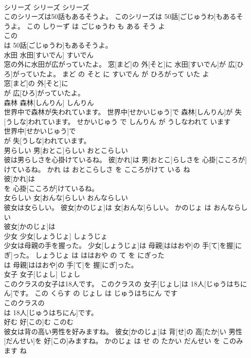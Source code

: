 \documentclass[8pt]{extreport}
\begin{document}
\begin{CJK}{UTF8}{min}
\\	シリーズ	シリーズ	シリーズ	
\\	このシリーズは50話もあるそうよ。	このシリーズは 50話[ごじゅうわ]もあるそうよ。	この しりーず は ごじゅうわ も ある そう よ	
\\	この
\\	は 50話[ごじゅうわ]もあるそうよ。			
\\	水田	水田[すいでん]	すいでん	
\\	窓の外に水田が広がっていたよ。	窓[まど]の 外[そと]に 水田[すいでん]が 広[ひろ]がっていたよ。	まど の そと に すいでん が ひろがって いた よ	
\\	窓[まど]の 外[そと]に
\\	が 広[ひろ]がっていたよ。			
\\	森林	森林[しんりん]	しんりん	
\\	世界中で森林が失われています。	世界中[せかいじゅう]で 森林[しんりん]が 失[うしな]われています。	せかいじゅう で しんりん が うしなわれて います	
\\	世界中[せかいじゅう]で
\\	が 失[うしな]われています。			
\\	男らしい	男[おとこ]らしい	おとこらしい	
\\	彼は男らしさを心掛けているね。	彼[かれ]は 男[おとこ]らしさを 心掛[こころが]けているね。	かれ は おとこらしさ を こころがけて いる ね	
\\	彼[かれ]は
\\	を 心掛[こころが]けているね。			
\\	女らしい	女[おんな]らしい	おんならしい	
\\	彼女は女らしい。	彼女[かのじょ]は 女[おんな]らしい。	かのじょ は おんならしい	
\\	彼女[かのじょ]は
\\	少女	少女[しょうじょ]	しょうじょ	
\\	少女は母親の手を握った。	少女[しょうじょ]は 母親[ははおや]の 手[て]を握[にぎ]った。	しょうじょ は ははおや の て を にぎった	
\\	は 母親[ははおや]の 手[て]を 握[にぎ]った。			
\\	女子	女子[じょし]	じょし	
\\	このクラスの女子は18人です。	このクラスの 女子[じょし]は 18人[じゅうはちにん]です。	この くらす の じょし は じゅうはちにん です	
\\	このクラスの
\\	は 18人[じゅうはちにん]です。			
\\	好む	好[この]む	このむ	
\\	彼女は背の高い男性を好みますね。	彼女[かのじょ]は 背[せ]の 高[たか]い 男性[だんせい]を 好[この]みますね。	かのじょ は せ の たかい だんせい を このみます ね	

\end{CJK}
\end{document}
